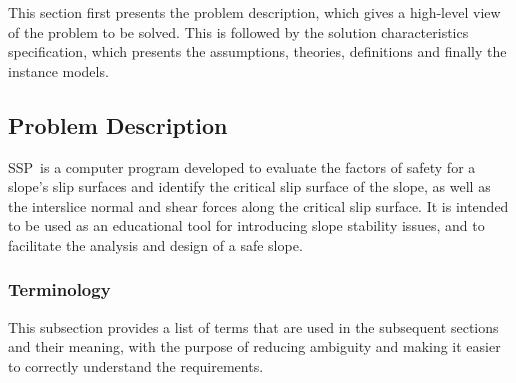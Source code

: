 \documentclass[12pt]{article}
\newcommand{\progname}{SSP}
\begin{document}
This section first presents the problem description, which gives a
high-level view of the problem to be solved.  This is followed by the
solution characteristics specification, which presents the
assumptions, theories, definitions and finally the instance models.

\subsection{Problem Description} \label{Sec_pd}

\progname\ is a computer program developed to evaluate the factors of safety 
for a slope's slip surfaces and identify the critical slip surface of the 
slope, as well as the interslice normal and shear forces along the critical 
slip surface. It is intended to be used as an educational tool for introducing 
slope stability issues, and to facilitate the analysis and design of a safe 
slope.

\subsubsection{Terminology}

This subsection provides a list of terms that are used in the subsequent
sections and their meaning, with the purpose of reducing ambiguity and
 making it easier to correctly understand the requirements.
\end{document}
